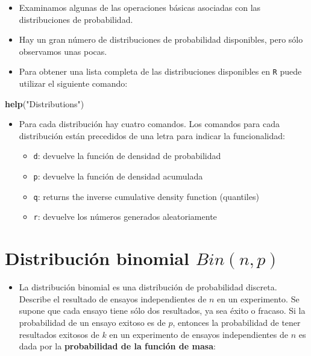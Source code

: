 \documentclass[]{book}
\newenvironment{Shaded}{\begin{snugshade}}{\end{snugshade}}
\newcommand{\KeywordTok}[1]{\textcolor[rgb]{0.13,0.29,0.53}{\textbf{#1}}}
\newcommand{\StringTok}[1]{\textcolor[rgb]{0.31,0.60,0.02}{#1}}
\newcommand{\NormalTok}[1]{#1}
\providecommand{\tightlist}{%
  \setlength{\itemsep}{0pt}\setlength{\parskip}{0pt}}
\begin{document}
\begin{itemize}
\item
  Examinamos algunas de las operaciones básicas asociadas con las
  distribuciones de probabilidad.
\item
  Hay un gran número de distribuciones de probabilidad disponibles, pero
  sólo observamos unas pocas.
\item
  Para obtener una lista completa de las distribuciones disponibles en
  \texttt{R} puede utilizar el siguiente comando:
\end{itemize}

\begin{Shaded}
\begin{Highlighting}[]
\KeywordTok{help}\NormalTok{(}\StringTok{"Distributions"}\NormalTok{)}
\end{Highlighting}
\end{Shaded}

\begin{itemize}
\item
  Para cada distribución hay cuatro comandos. Los comandos para cada
  distribución están precedidos de una letra para indicar la
  funcionalidad:

  \begin{itemize}
  \tightlist
  \item
    \texttt{d}: devuelve la función de densidad de probabilidad
  \item
    \texttt{p}: devuelve la función de densidad acumulada
  \item
    \texttt{q}: returns the inverse cumulative density function
    (quantiles)
  \item
    \texttt{r}: devuelve los números generados aleatoriamente
  \end{itemize}
\end{itemize}

\section{\texorpdfstring{Distribución binomial
\(Bin(n,p)\)}{Distribución binomial Bin(n,p)}}\label{distribucion-binomial-binnp}

\begin{itemize}
\tightlist
\item
  La distribución binomial es una distribución de probabilidad discreta.
  Describe el resultado de ensayos independientes de \(n\) en un
  experimento. Se supone que cada ensayo tiene sólo dos resultados, ya
  sea éxito o fracaso. Si la probabilidad de un ensayo exitoso es de
  \(p\), entonces la probabilidad de tener resultados exitosos de \(k\)
  en un experimento de ensayos independientes de \(n\) es dada por la
  \textbf{probabilidad de la función de masa}:
\end{itemize}
\end{document}
